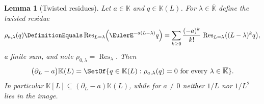 \documentclass[11pt,oneside]{article}
\theoremstyle{plain}
\newtheorem{lemma}[theorem]{Lemma}
\theoremstyle{definition}
\theoremstyle{remark}
\newcommand{\K}{\mathbb{K}}
\begin{document}
\begin{lemma}[Twisted residues]\label{plt:lem:dif-image-rational}
Let \(a\in\K\) and \(q\in\K(L)\).  For \(\lambda\in\overline{\K}\) define the
\emph{twisted residue}
\begin{equation}\label{plt:eq:dif-twisted-residue}
  \rho_{a,\lambda}(q)\DefinitionEquals
  \operatorname{Res}_{L=\lambda}
  \Bigl(\EulerE^{-a(L-\lambda)}q\Bigr)
  =\sum_{k\ge0}\frac{(-a)^{k}}{k!}\,
   \operatorname{Res}_{L=\lambda}\bigl((L-\lambda)^{k}q\bigr),
\end{equation}
a finite sum, and note \(\rho_{0,\lambda}=\operatorname{Res}_{\lambda}\).
Then
\begin{equation}\label{plt:eq:dif-rational-image}
  \bigl(\partial_{L}-a\bigr)\K(L)
  =\SetOf{q\in\K(L):\rho_{a,\lambda}(q)=0
    \text{ for every }\lambda\in\overline{\K}} .
\end{equation}
In particular \(\K[L]\subseteq(\partial_{L}-a)\K(L)\), while for \(a\ne0\)
neither \(1/L\) nor \(1/L^{2}\) lies in the image.
\end{lemma}
\end{document}
